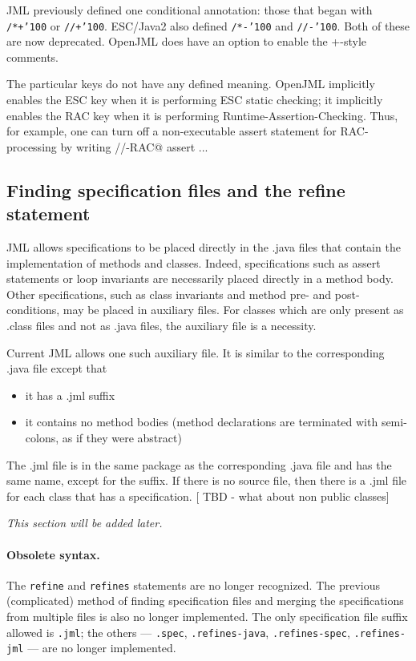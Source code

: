 \documentclass{report}%
\newcommand{\at}{{\tt \char'100}}
\newcommand{\nospace}{\setlength{\itemsep}{0in}\setlength{\parsep}{0in}\setlength{\parskip}{0in}\setlength{\topsep}{0in}}
\begin{document}
JML previously defined one conditional annotation: those that began with {\tt /*+\at} or {\tt //+\at}. ESC/Java2 also defined
{\tt /*-\at} and {\tt //-\at}. Both of these are now deprecated. OpenJML does have an option to enable the +-style comments.

The particular keys do not have any defined meaning. OpenJML implicitly enables the ESC key when it is performing
ESC static checking; it implicitly enables the RAC key when it is performing Runtime-Assertion-Checking. Thus, for
example, one can turn off a non-executable assert statement for RAC-processing by writing //-RAC@ assert ... 


\subsection{Finding specification files and the refine statement}

JML allows specifications to be placed directly in the .java files that contain the implementation of methods and
classes. Indeed, specifications such as assert statements or loop invariants are necessarily placed directly in
a method body. Other specifications, such as class invariants and method pre- and post-conditions, may be placed in
auxiliary files. For classes which are only present as .class files and not as .java files, the auxiliary file is
a necessity.

Current JML allows one such auxiliary file. It is similar to the corresponding .java file except that
\begin{itemize} \nospace
\item it has a .jml suffix
\item it contains no method bodies (method declarations are terminated with semi-colons, as if they were abstract)
\end{itemize}
The .jml file is in the same package as the corresponding .java file and has the same name, except for the suffix.
If there is no source file, then there is a .jml file for each class that has a specification. [ TBD - what about non public classes]
 
\textit{This section will be added later.} %

\paragraph{Obsolete syntax.} The {\tt refine} and {\tt refines} statements are no longer recognized.
The previous (complicated) method of finding specification files and merging the specifications
from multiple files is also no longer implemented. The only specification file suffix allowed is 
{\tt .jml}; the others --- {\tt .spec}, {\tt .refines-java}, {\tt .refines-spec}, {\tt .refines-jml} --- 
are no longer implemented.
\end{document}
